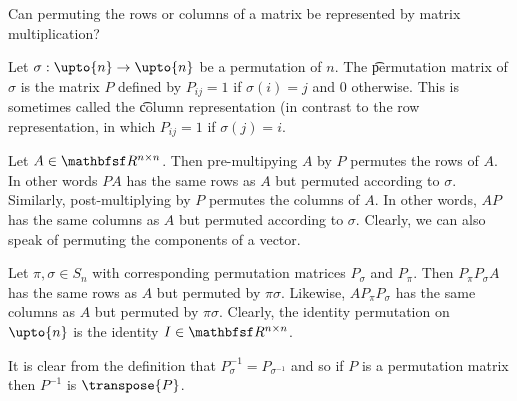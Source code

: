 

Can permuting the rows or columns of a matrix be represented by matrix multiplication?


Let $\sigma : \upto{n} \to \upto{n}$ be a permutation of $n$.
The \t{permutation matrix} of $\sigma $ is the matrix $P$ defined by $P_{ij} = 1$ if $\sigma (i) = j$ and 0 otherwise.
This is sometimes called the \t{column representation} (in contrast to the row representation, in which $P_{ij} = 1$ if $\sigma (j) = i$.

Let $A \in \R ^{n \times n}$.
Then pre-multipying $A$ by $P$ permutes the rows of $A$.
In other words $PA$ has the same rows as $A$ but permuted according to $\sigma $.
Similarly, post-multiplying by $P$ permutes the columns of $A$.
In other words, $AP$ has the same columns as $A$ but permuted according to $\sigma $.
Clearly, we can also speak of permuting the components of a vector.


Let $\pi , \sigma  \in S_n$ with corresponding permutation matrices $P_\sigma $ and $P_\pi $.
Then $P_{\pi }P_{\sigma }A$ has the same rows as $A$ but permuted by $\pi \sigma $.
Likewise, $AP_{\pi }P_{\sigma }$ has the same columns as $A$ but permuted by $\pi \sigma $.
Clearly, the identity permutation on $\upto{n}$ is the identity $I \in \R ^{n \times n}$.


It is clear from the definition that $P_{\sigma }^{-1} = P_{\sigma ^{-1}}$ and so if $P$ is a permutation matrix then $P^{-1}$ is $\transpose{P}$.

\blankpage

